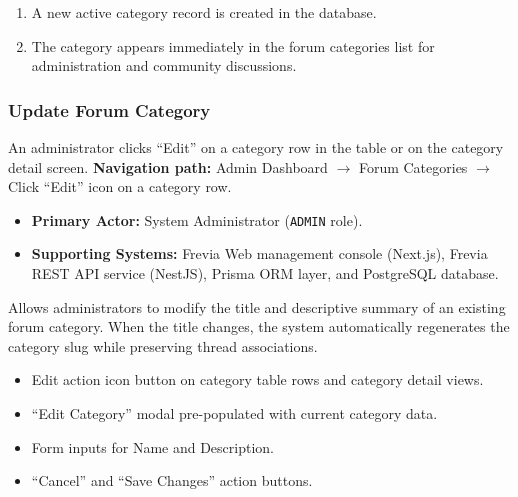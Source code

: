 \begin{enumerate}[leftmargin=1.6em,topsep=3pt,itemsep=2pt,parsep=0pt]
    \item A new active category record is created in the database.
    \item The category appears immediately in the forum categories list for administration and community discussions.
\end{enumerate}

\subsubsection{ Update Forum Category}

An administrator clicks ``Edit'' on a category row in the table or on the category detail screen.\newline
\textbf{Navigation path:} Admin Dashboard $\rightarrow$ Forum Categories $\rightarrow$ Click ``Edit'' icon on a category row.


\begin{itemize}[leftmargin=1.6em,topsep=3pt,itemsep=2pt,parsep=0pt,label=$\bullet$]
    \item \textbf{Primary Actor:} System Administrator (\texttt{ADMIN} role).
    \item \textbf{Supporting Systems:} Frevia Web management console (Next.js), Frevia REST API service (NestJS), Prisma ORM layer, and PostgreSQL database.
\end{itemize}

\noindent Allows administrators to modify the title and descriptive summary of an existing forum category. When the title changes, the system automatically regenerates the category slug while preserving thread associations.

\begin{itemize}[leftmargin=1.6em,topsep=3pt,itemsep=2pt,parsep=0pt,label=$\bullet$]
    \item Edit action icon button on category table rows and category detail views.
    \item ``Edit Category'' modal pre-populated with current category data.
    \item Form inputs for Name and Description.
    \item ``Cancel'' and ``Save Changes'' action buttons.
\end{itemize}

